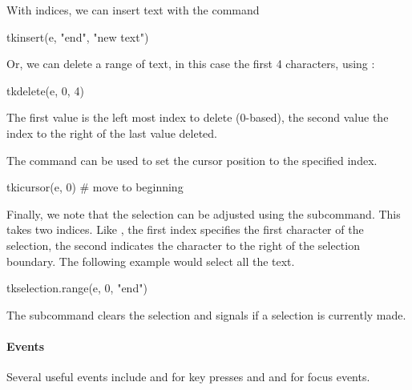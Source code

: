 With indices, we can insert  text with the  command
\begin{Schunk}
\begin{Sinput}
 tkinsert(e, "end", "new text")
\end{Sinput}
\end{Schunk}

Or, we can delete a range of text, in this case the first 4
characters, using :
\begin{Schunk}
\begin{Sinput}
 tkdelete(e, 0, 4)
\end{Sinput}
\end{Schunk}
%
The first value is the left most index to delete (0-based), the second
value the index to the right of the last value deleted.

The  command can be used to set the
cursor position to the specified index.
\begin{Schunk}
\begin{Sinput}
 tkicursor(e, 0)                         # move to beginning
\end{Sinput}
\end{Schunk}

Finally, we note that the selection can be adjusted using the
 subcommand. This takes two
indices. Like , the first index specifies the first character of
the selection, the second indicates the character to the right of the
selection boundary. The following example would select all the text.
\begin{Schunk}
\begin{Sinput}
 tkselection.range(e, 0, "end")
\end{Sinput}
\end{Schunk}
The  subcommand clears the selection and  signals if a selection is currently made.

\paragraph{Events}
Several useful events include  and
 for key presses and 
and  for focus events.


